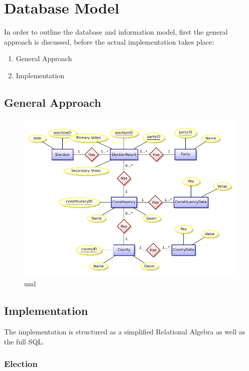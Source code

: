 
\section{Database Model}

In order to outline the database and information model, first the general
approach is discussed, before the actual implementation takes place:

\begin{enumerate}
\def\labelenumi{\arabic{enumi}.}
\itemsep1pt\parskip0pt
\item
  General Approach
\item
  Implementation
\end{enumerate}

\subsection{General Approach}\label{general-approach}

\begin{figure}[htbp]
\centering
\includegraphics[width=1.1\textwidth]{../img/KIQu2J3.png}
\caption{uml}
\end{figure}

\subsection{Implementation}\label{implementation}

The implementation is structured as a simplified Relational Algebra as well as
the full SQL.

\subsubsection{Election}\label{ImplementationElection}

